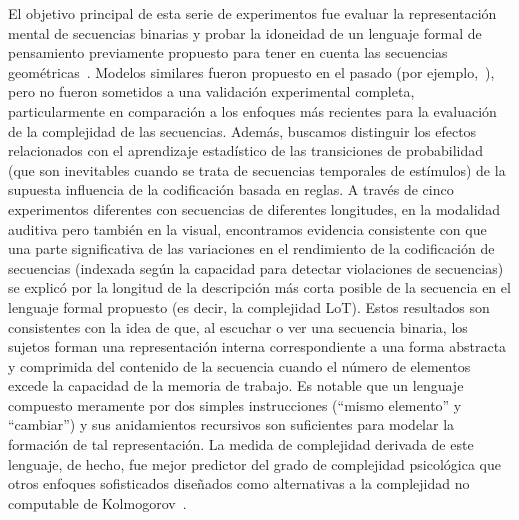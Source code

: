 El objetivo principal de esta serie de experimentos fue evaluar la representación mental de secuencias binarias y probar la idoneidad de un lenguaje formal de pensamiento previamente propuesto para tener en cuenta las secuencias geométricas~\cite{amalric2017language}. Modelos similares fueron propuesto en el pasado (por ejemplo,~\cite{f32,f36,f45}), pero no fueron sometidos a una validación experimental completa, particularmente en comparación a los enfoques más recientes para la evaluación de la complejidad de las secuencias. Además, buscamos distinguir los efectos relacionados con el aprendizaje estadístico de las transiciones de probabilidad (que son inevitables cuando se trata de secuencias temporales de estímulos) de la supuesta influencia de la codificación basada en reglas. A través de cinco experimentos diferentes con secuencias de diferentes longitudes, en la modalidad auditiva pero también en la visual, encontramos evidencia consistente con que una parte significativa de las variaciones en el rendimiento de la codificación de secuencias (indexada según la capacidad para detectar violaciones de secuencias) se explicó por la longitud de la descripción más corta posible de la secuencia en el lenguaje formal propuesto (es decir, la complejidad LoT). Estos resultados son consistentes con la idea de que, al escuchar o ver una secuencia binaria, los sujetos forman una representación interna correspondiente a una forma abstracta y comprimida del contenido de la secuencia cuando el número de elementos excede la capacidad de la memoria de trabajo. Es notable que un lenguaje compuesto meramente por dos simples instrucciones (``mismo elemento'' y ``cambiar'') y sus anidamientos recursivos son suficientes para modelar la formación de tal representación. La medida de complejidad derivada de este lenguaje, de hecho, fue mejor predictor del grado de complejidad psicológica que otros enfoques sofisticados diseñados como alternativas a la complejidad no computable de Kolmogorov~\cite{f46,f47}.


